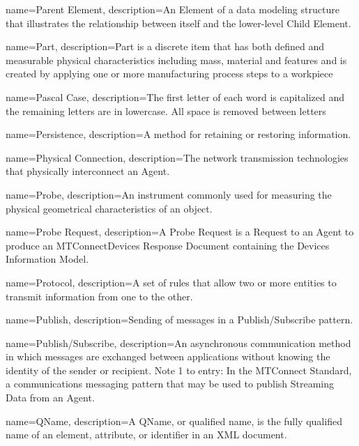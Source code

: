 {
    name={Parent Element},
	description={An \gls{Element} of a data modeling structure that illustrates the relationship between itself and the lower-level \gls{Child Element}.}
}

{
    name={Part},
	description={\gls{Part} is a discrete item that has both defined and measurable physical characteristics including mass, material and features and is created by applying one or more manufacturing process steps to a workpiece}
}

{
    name={Pascal Case},
	description={The first letter of each word is capitalized and the remaining letters are in lowercase. All space is removed between letters}
}

{
    name={Persistence},
	description={A method for retaining or restoring information.}
}

{
    name={Physical Connection},
	description={The network transmission technologies that physically interconnect an \gls{Agent}.}
}

{
    name={Probe},
	description={An instrument commonly used for measuring the physical geometrical characteristics of an object.}
}

{
    name={Probe Request},
	description={A \gls{Probe Request} is a \gls{Request} to an \gls{Agent} to produce an \gls{MTConnectDevices Response Document} containing the \gls{Devices Information Model}.}
}

{
    name={Protocol},
	description={A set of rules that allow two or more entities to transmit information from one to the other.}
}

{
    name={Publish},
	description={Sending of messages in a \gls{Publish/Subscribe} pattern.}
}

{
    name={Publish/Subscribe},
	description={An asynchronous communication method in which messages are exchanged between applications without knowing the identity of the sender or recipient.
Note 1 to entry: In the MTConnect Standard, a communications messaging pattern that may be used to publish \gls{Streaming Data} from an \gls{Agent}. }
}

{
    name={QName},
	description={A \gls{QName}, or qualified name, is the fully qualified name of an element, attribute, or identifier in an XML document.}
}

